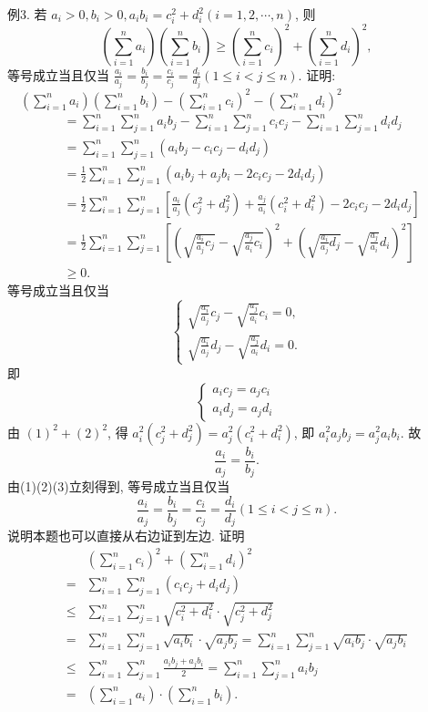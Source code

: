例3. 若 $a_i>0, b_i>0, a_i b_i=c_i^2+d_i^2(i=1,2, \cdots, n)$, 则
$$
\left(\sum_{i=1}^n a_i\right)\left(\sum_{i=1}^n b_i\right) \geqslant\left(\sum_{i=1}^n c_i\right)^2+\left(\sum_{i=1}^n d_i\right)^2,
$$
等号成立当且仅当 $\frac{a_i}{a_j}=\frac{b_i}{b_j}=\frac{c_i}{c_j}=\frac{d_i}{d_j}(1 \leqslant i<j \leqslant n)$.
证明:$\quad\left(\sum_{i=1}^n a_i\right)\left(\sum_{i=1}^n b_i\right)-\left(\sum_{i=1}^n c_i\right)^2-\left(\sum_{i=1}^n d_i\right)^2$
$$
\begin{aligned}
& =\sum_{i=1}^n \sum_{j=1}^n a_i b_j-\sum_{i=1}^n \sum_{j=1}^n c_i c_j-\sum_{i=1}^n \sum_{j=1}^n d_i d_j \\
& =\sum_{i=1}^n \sum_{j=1}^n\left(a_i b_j-c_i c_j-d_i d_j\right) \\
& =\frac{1}{2} \sum_{i=1}^n \sum_{j=1}^n\left(a_i b_j+a_j b_i-2 c_i c_j-2 d_i d_j\right) \\
& =\frac{1}{2} \sum_{i=1}^n \sum_{j=1}^n\left[\frac{a_i}{a_j}\left(c_j^2+d_j^2\right)+\frac{a_j}{a_i}\left(c_i^2+d_i^2\right)-2 c_i c_j-2 d_i d_j\right] \\
& =\frac{1}{2} \sum_{i=1}^n \sum_{j=1}^n\left[\left(\sqrt{\frac{a_i}{a_j} c_j}-\sqrt{\frac{a_j}{a_i} c_i}\right)^2+\left(\sqrt{\frac{a_i}{a_j} d_j}-\sqrt{\frac{a_j}{a_i}} d_i\right)^2\right] \\
& \geqslant 0 .
\end{aligned}
$$
等号成立当且仅当
$$
\left\{\begin{array}{l}
\sqrt{\frac{a_i}{a_j}} c_j-\sqrt{\frac{a_j}{a_i}} c_i=0, \\
\sqrt{\frac{a_i}{a_j}} d_j-\sqrt{\frac{a_j}{a_i}} d_i=0 .
\end{array}\right.
$$
即
$$
\left\{\begin{array}{l}
a_i c_j=a_j c_i \label{(1)}\\
a_i d_j=a_j d_i \label{(2)}
\end{array}\right.
$$
由 $(1)^2+(2)^2$, 得 $a_i^2\left(c_j^2+d_j^2\right)=a_j^2\left(c_i^2+d_i^2\right)$, 即 $a_i^2 a_j b_j=a_j^2 a_i b_i$. 故
$$
\frac{a_i}{a_j}=\frac{b_i}{b_j} . \label{(3)}
$$
由(1)(2)(3)立刻得到, 等号成立当且仅当
$$
\frac{a_i}{a_j}=\frac{b_i}{b_j}=\frac{c_i}{c_j}=\frac{d_i}{d_j}(1 \leqslant i<j \leqslant n) .
$$
说明本题也可以直接从右边证到左边.
证明
$$
\begin{aligned}
& \left(\sum_{i=1}^n c_i\right)^2+\left(\sum_{i=1}^n d_i\right)^2 \\
= & \sum_{i=1}^n \sum_{j=1}^n\left(c_i c_j+d_i d_j\right) \\
\leqslant & \sum_{i=1}^n \sum_{j=1}^n \sqrt{c_i^2+d_i^2} \cdot \sqrt{c_j^2+d_j^2} \\
= & \sum_{i=1}^n \sum_{j=1}^n \sqrt{a_i b_i} \cdot \sqrt{a_j b_j}=\sum_{i=1}^n \sum_{j=1}^n \sqrt{a_i b_j} \cdot \sqrt{a_j b_i} \\
\leqslant & \sum_{i=1}^n \sum_{j=1}^n \frac{a_i b_j+a_j b_i}{2}=\sum_{i=1}^n \sum_{j=1}^n a_i b_j \\
= & \left(\sum_{i=1}^n a_i\right) \cdot\left(\sum_{i=1}^n b_i\right) .
\end{aligned}
$$



